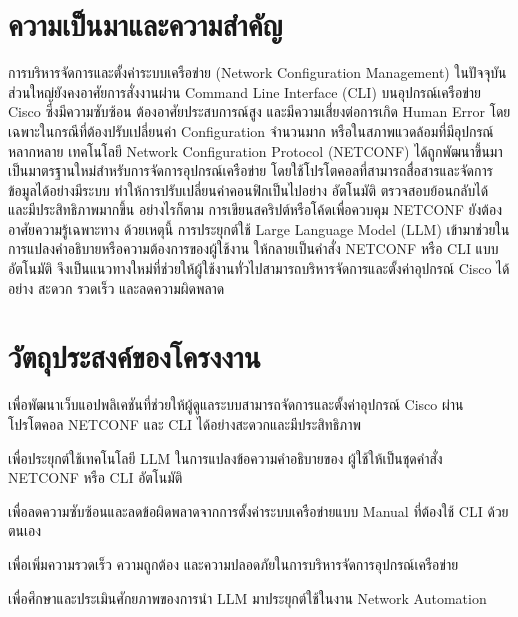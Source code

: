 
\section{ความเป็นมาและความสำคัญ} 

\hspace*{1.5em} %
การบริหารจัดการและตั้งค่าระบบเครือข่าย (Network Configuration Management)
ในปัจจุบัน ส่วนใหญ่ยังคงอาศัยการสั่งงานผ่าน Command Line Interface (CLI) บนอุปกรณ์เครือข่าย Cisco ซึ่งมีความซับซ้อน ต้องอาศัยประสบการณ์สูง และมีความเสี่ยงต่อการเกิด Human Error โดยเฉพาะในกรณีที่ต้องปรับเปลี่ยนค่า Configuration จำนวนมาก หรือในสภาพแวดล้อมที่มีอุปกรณ์หลากหลาย
เทคโนโลยี Network Configuration Protocol (NETCONF) ได้ถูกพัฒนาขึ้นมาเป็นมาตรฐานใหม่สำหรับการจัดการอุปกรณ์เครือข่าย โดยใช้โปรโตคอลที่สามารถสื่อสารและจัดการข้อมูลได้อย่างมีระบบ ทำให้การปรับเปลี่ยนค่าคอนฟิกเป็นไปอย่าง อัตโนมัติ ตรวจสอบย้อนกลับได้ และมีประสิทธิภาพมากขึ้น อย่างไรก็ตาม การเขียนสคริปต์หรือโค้ดเพื่อควบคุม NETCONF ยังต้องอาศัยความรู้เฉพาะทาง
\hspace*{1.5em}
ด้วยเหตุนี้ การประยุกต์ใช้ Large Language Model (LLM) เข้ามาช่วยในการแปลงคำอธิบายหรือความต้องการของผู้ใช้งาน ให้กลายเป็นคำสั่ง NETCONF หรือ CLI แบบอัตโนมัติ จึงเป็นแนวทางใหม่ที่ช่วยให้ผู้ใช้งานทั่วไปสามารถบริหารจัดการและตั้งค่าอุปกรณ์ Cisco ได้อย่าง สะดวก รวดเร็ว และลดความผิดพลาด


\section{วัตถุประสงค์ของโครงงาน}

\begin{mycustomenum}[label=1.2.\arabic*] %
    \item เพื่อพัฒนาเว็บแอปพลิเคชันที่ช่วยให้ผู้ดูแลระบบสามารถจัดการและตั้งค่าอุปกรณ์ Cisco ผ่านโปรโตคอล NETCONF และ CLI ได้อย่างสะดวกและมีประสิทธิภาพ
    \item เพื่อประยุกต์ใช้เทคโนโลยี LLM ในการแปลงข้อความคำอธิบายของ ผู้ใช้ให้เป็นชุดคำสั่ง NETCONF หรือ CLI อัตโนมัติ 
    \item เพื่อลดความซับซ้อนและลดข้อผิดพลาดจากการตั้งค่าระบบเครือข่ายแบบ Manual ที่ต้องใช้ CLI ด้วยตนเอง
    \item เพื่อเพิ่มความรวดเร็ว ความถูกต้อง และความปลอดภัยในการบริหารจัดการอุปกรณ์เครือข่าย
    \item เพื่อศึกษาและประเมินศักยภาพของการนำ LLM มาประยุกต์ใช้ในงาน Network Automation 
\end{mycustomenum}



